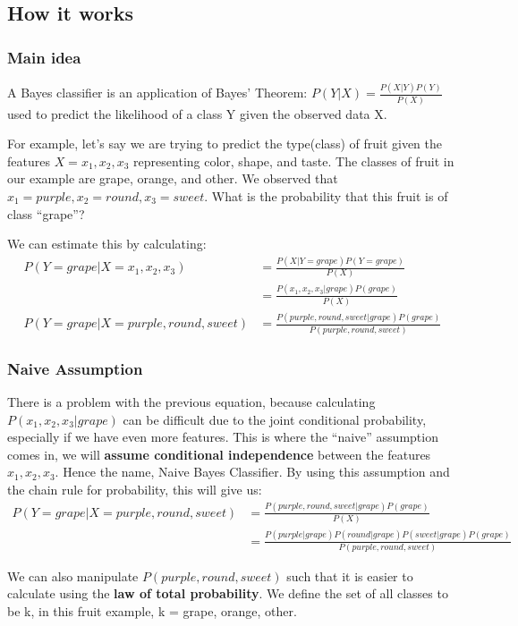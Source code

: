 \documentclass{article}
\begin{document}
\subsection{How it works}
\subsubsection{Main idea}
A Bayes classifier is an application of Bayes' Theorem: $P(Y|X) = \frac{P(X|Y)P(Y)}{P(X)}$ used to predict the likelihood of a class Y given the observed data X.\newline

For example, let's say we are trying to predict the type(class) of fruit given the features $X = x_{1},x_{2},x_{3}$ representing color, shape, and taste. The classes of fruit in our example are grape, orange, and other. We observed that $x_{1} = purple, x_{2} = round, x_{3} = sweet$. What is the probability that this fruit is of class ``grape''?\newline

We can estimate this by calculating: 
\begin{align*}
P(Y=grape|X=x_{1},x_{2},x_{3})&=\frac{P(X|Y=grape)P(Y=grape)}{P(X)}\\
&= \frac{P(x_{1},x_{2},x_{3}|grape)P(grape)}{P(X)}\\
P(Y=grape|X=purple,round,sweet) &= \frac{P(purple,round,sweet|grape)P(grape)}{P(purple,round,sweet)}
\end{align*}

\subsubsection{Naive Assumption}
There is a problem with the previous equation, because calculating $P(x_{1},x_{2},x_{3}|grape)$ can be difficult due to the joint conditional probability, especially if we have even more features. This is where the ``naive'' assumption comes in, we will \textbf{assume conditional independence} between the features $x_{1},x_{2},x_{3}$. Hence the name, Naive Bayes Classifier. By using this assumption and the chain rule for probability, this will give us:
\begin{align*}
P(Y=grape|X=purple,round,sweet)&= \frac{P(purple,round,sweet|grape)P(grape)}{P(X)}\\
&= \frac{P(purple|grape)P(round|grape)P(sweet|grape)P(grape)}{P(purple,round,sweet)}
\end{align*}

We can also manipulate $P(purple,round,sweet)$ such that it is easier to calculate using the \textbf{law of total probability}. We define the set of all classes to be k, in this fruit example, k = {grape, orange, other}. 
\end{document}
